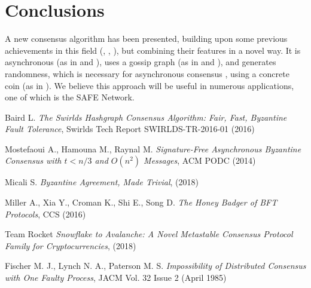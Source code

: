 \documentclass[a4paper,fleqn]{article}
\begin{document}
\section{Conclusions}

A new consensus algorithm has been presented, building upon some previous achievements in this
field (\cite{hg}, \cite{aba}, \cite{trivial}), but combining their features in a novel way. It is
asynchronous (as in \cite{hg} and \cite{aba}), uses a gossip graph (as in \cite{hg} and
\cite{snowflake}), and generates randomness, which is necessary for asynchronous consensus
\cite{flp}, using a concrete coin (as in \cite{trivial}). We believe this approach will be useful
in numerous applications, one of which is the SAFE Network.

\label{references}

\begin{thebibliography}{4}

 Baird L. \textit{The Swirlds Hashgraph Consensus Algorithm: Fair, Fast, Byzantine
	Fault Tolerance}, Swirlds Tech Report SWIRLDS-TR-2016-01 (2016)

 Mostefaoui A., Hamouna M., Raynal M. \textit{Signature-Free Asynchronous Byzantine
	Consensus with $t < n/3$ and $O(n^2)$ Messages}, ACM PODC (2014)

 Micali S. \textit{Byzantine Agreement, Made Trivial}, (2018)

 Miller A., Xia Y., Croman K., Shi E., Song D. \textit{The Honey Badger of BFT
	Protocols}, CCS (2016)

 Team Rocket \textit{Snowflake to Avalanche: A Novel Metastable Consensus
	Protocol Family for Cryptocurrencies}, (2018)

 Fischer M. J., Lynch N. A., Paterson M. S. \textit{Impossibility of Distributed
	Consensus with One Faulty Process}, JACM Vol. 32 Issue 2 (April 1985)

\end{thebibliography}
\end{document}

